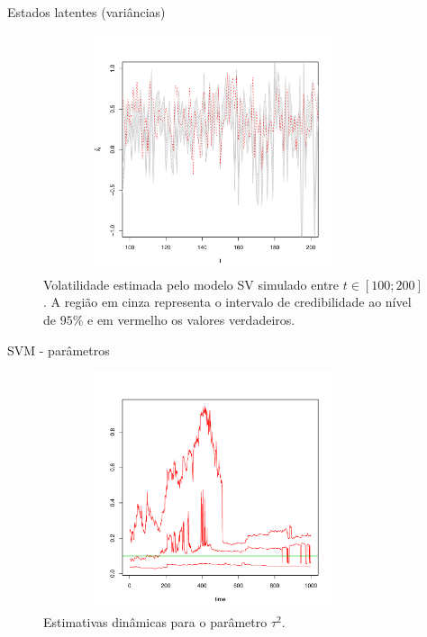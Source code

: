 \documentclass{beamer}
\begin{document}
\begin{frame}{Estados latentes (variâncias)}


\begin{figure}
\begin{center}
 \includegraphics[height=7cm,width =10cm]{processo_1_01_02_05.pdf}
 \end{center}
\caption{Volatilidade estimada pelo modelo SV simulado entre $t \in [100 ;200]$. A região em cinza representa o intervalo de credibilidade ao nível de $95\%$ e em vermelho os valores verdadeiros.} 
\end{figure}

 \end{frame}
 
 
 \begin{frame}{SVM - parâmetros}

 
 \begin{figure}
\begin{center}
 \includegraphics[height=7cm,width =10cm]{tau_1_01_02_05.pdf}
 \end{center}
\caption{ Estimativas dinâmicas para o parâmetro $\tau^2$.} 
\end{figure}

 \end{frame}
 
\end{document}
